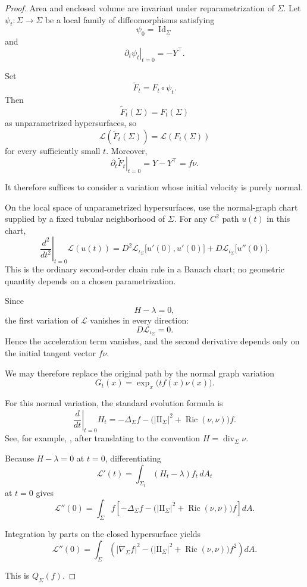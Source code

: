 \documentclass[11pt,reqno]{amsart}
\numberwithin{equation}{section}
\theoremstyle{definition}
\theoremstyle{remark}
\newcommand{\divSigma}{\operatorname{div}_{\Sigma}}
\newcommand{\Ric}{\operatorname{Ric}}
\begin{document}
\begin{proof}
Area and enclosed volume are invariant under reparametrization of
\(\Sigma\). Let \(\psi_t:\Sigma\to\Sigma\) be a local family of
diffeomorphisms satisfying
\[
\psi_0=\operatorname{Id}_\Sigma
\]
and
\[
\left.\partial_t\psi_t\right|_{t=0}
=
-Y^\top.
\]

Set
\[
\widetilde F_t
=
F_t\circ\psi_t.
\]
Then
\[
\widetilde F_t(\Sigma)=F_t(\Sigma)
\]
as unparametrized hypersurfaces, so
\[
\mathcal L(\widetilde F_t(\Sigma))
=
\mathcal L(F_t(\Sigma))
\]
for every sufficiently small \(t\). Moreover,
\[
\left.
\partial_t\widetilde F_t
\right|_{t=0}
=
Y-Y^\top
=
f\nu.
\]

It therefore suffices to consider a variation whose initial velocity is
purely normal.

{On the local space of unparametrized hypersurfaces, use the
normal-graph chart supplied by a fixed tubular neighborhood of \(\Sigma\).
For any \(C^2\) path \(u(t)\) in this chart,}
\[
\left.
\frac{d^2}{dt^2}
\right|_{t=0}
\mathcal L(u(t))
=
D^2\mathcal L_{\iota_\Sigma}
\bigl[u'(0),u'(0)\bigr]
+
 D\mathcal L_{\iota_\Sigma}
 \bigl[u''(0)\bigr].
\]
{This is the ordinary second-order chain rule in a Banach chart;
no geometric quantity depends on a chosen parametrization.}

Since
\[
H-\lambda=0,
\]
the first variation of \(\mathcal L\) vanishes in every direction:
\[
D\mathcal L_{\iota_\Sigma}=0.
\]
Hence the acceleration term vanishes, and the second derivative depends
only on the initial tangent vector \(f\nu\).

We may therefore replace the original path by the normal graph variation
\[
G_t(x)
=
\exp_x\bigl(tf(x)\nu(x)\bigr).
\]

For this normal variation, the standard evolution formula is
\[
\left.
\frac{d}{dt}
\right|_{t=0}
H_t
=
-\Delta_\Sigma f
-
\bigl(
|\mathrm{II}_\Sigma|^2+\Ric(\nu,\nu)
\bigr)f.
\]
See, for example, \cite[\S 1.3.4, pp.~27--30]{Ritore2023}, after translating
to the convention \(H=\divSigma\nu\).

Because \(H-\lambda=0\) at \(t=0\), differentiating
\[
\mathcal L'(t)
=
\int_{\Sigma_t}
(H_t-\lambda)f_t\,dA_t
\]
at \(t=0\) gives
\[
\mathcal L''(0)
=
\int_\Sigma
f
\left[
-\Delta_\Sigma f
-
\bigl(
|\mathrm{II}_\Sigma|^2+\Ric(\nu,\nu)
\bigr)f
\right]dA.
\]

Integration by parts on the closed hypersurface yields
\[
\mathcal L''(0)
=
\int_\Sigma
\left(
|\nabla_\Sigma f|^2
-
\bigl(
|\mathrm{II}_\Sigma|^2+\Ric(\nu,\nu)
\bigr)f^2
\right)dA.
\]

This is \(Q_\Sigma(f)\).
\end{proof}
\end{document}
